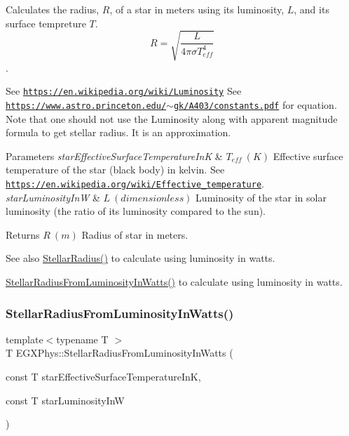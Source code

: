 Calculates the radius, $R$, of a star in meters using its luminosity, $L$, and its surface tempreture $T$. \[R=\sqrt{\dfrac{L}{4\pi \sigma T_{eff}^4}}\]. 

See \href{https://en.wikipedia.org/wiki/Luminosity}{\tt https\+://en.\+wikipedia.\+org/wiki/\+Luminosity} See \href{https://www.astro.princeton.edu/~gk/A403/constants.pdf}{\tt https\+://www.\+astro.\+princeton.\+edu/$\sim$gk/\+A403/constants.\+pdf} for equation. Note that one should not use the Luminosity along with apparent magnitude formula to get stellar radius. It is an approximation.


\begin{DoxyParams}{Parameters}
{\em star\+Effective\+Surface\+Temperature\+InK} & $T_{eff}\ (K)$ Effective surface temperature of the star (black body) in kelvin. See \href{https://en.wikipedia.org/wiki/Effective_temperature}{\tt https\+://en.\+wikipedia.\+org/wiki/\+Effective\+\_\+temperature}. \\
\hline
{\em star\+Luminosity\+InW} & $L\ (dimensionless)$ Luminosity of the star in solar luminosity (the ratio of its luminosity compared to the sun). \\
\hline
\end{DoxyParams}
\begin{DoxyReturn}{Returns}
$R\ (m)$ Radius of star in meters. 
\end{DoxyReturn}
\begin{DoxySeeAlso}{See also}
\mbox{\hyperlink{group___e_g_x_phys-_stellar_radius_ga612cd22c37341a1864cd2fc5c858e18e}{Stellar\+Radius()}} to calculate using luminosity in watts. 

\mbox{\hyperlink{group___e_g_x_phys-_stellar_radius_ga59f0d5d89a857d30bff4c93713ee5bd9}{Stellar\+Radius\+From\+Luminosity\+In\+Watts()}} to calculate using luminosity in watts. 
\end{DoxySeeAlso}
\mbox{\label{group___e_g_x_phys-_stellar_radius_ga59f0d5d89a857d30bff4c93713ee5bd9}} 
\subsubsection{\texorpdfstring{Stellar\+Radius\+From\+Luminosity\+In\+Watts()}{StellarRadiusFromLuminosityInWatts()}}
{\footnotesize\ttfamily template$<$typename T $>$ \\
T E\+G\+X\+Phys\+::\+Stellar\+Radius\+From\+Luminosity\+In\+Watts (\begin{DoxyParamCaption}\item[{const T}]{star\+Effective\+Surface\+Temperature\+InK,  }\item[{const T}]{star\+Luminosity\+InW }\end{DoxyParamCaption})}



